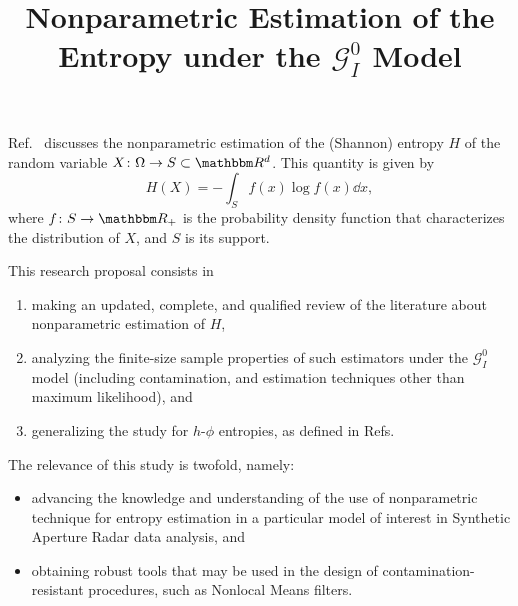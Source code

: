 \documentclass{article}
\title{Nonparametric Estimation of the Entropy under the $\mathcal G_I^0$ Model}
\author{}
\date{}
\begin{document}
\maketitle

Ref.~\cite{NonparametricEntropyEstimationanOverview} discusses the nonparametric estimation of the (Shannon) entropy $H$ of the random variable $X\colon\Omega\rightarrow S\subset \mathbbm R^d$.
This quantity is given by
\begin{equation}
H(X) = -\int_S f(x) \log f(x) \dd{x},
\end{equation}
where $f\colon S\rightarrow \mathbbm R_+$ is the probability density function that characterizes the distribution of $X$, and $S$ is its support.

This research proposal consists in
\begin{enumerate}
	\item making an updated, complete, and qualified review of the literature about nonparametric estimation of $H$,
	\item analyzing the finite-size sample properties of such estimators under the $\mathcal G_I^0$ model (including contamination, and estimation techniques other than maximum likelihood), and
	\item generalizing the study for $h$-$\phi$ entropies, as defined in Refs.~\cite{h-phiEntropyDifferentialMetric1997,salicruetal1993} 
\end{enumerate}

The relevance of this study is twofold, namely:
\begin{itemize}
	\item advancing the knowledge and understanding of the use of nonparametric technique for entropy estimation in a particular model of interest in Synthetic Aperture Radar data analysis, and
	\item obtaining robust tools that may be used in the design of contamination-resistant procedures, such as Nonlocal Means filters.
\end{itemize}



\end{document}
